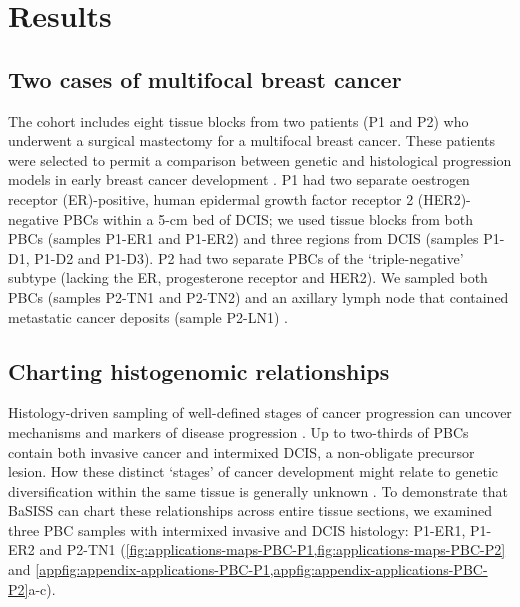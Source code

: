 \section{Results}
\subsection{Two cases of multifocal breast cancer}
\label{sec:applications-cohort-introduction}
The cohort includes eight tissue blocks from two patients (P1 and P2) who underwent a surgical mastectomy for a multifocal breast cancer. These patients were selected to permit a comparison between genetic and histological progression models in early breast cancer development \parencite{Cowell2013-du} . P1 had two separate oestrogen receptor (ER)-positive, human epidermal growth factor receptor 2 (HER2)-negative \acfp{PBC} within a 5-cm bed of \ac{DCIS}; we used tissue blocks from both \acp{PBC} (samples P1-ER1 and P1-ER2) and three regions from \ac{DCIS} (samples P1-D1, P1-D2 and P1-D3). P2 had two separate PBCs of the `triple-negative' subtype (lacking the ER, progesterone receptor and HER2). We sampled both PBCs (samples P2-TN1 and P2-TN2) and an axillary lymph node that contained metastatic cancer deposits (sample P2-LN1) .


\subsection{Charting histogenomic relationships}

Histology-driven sampling of well-defined stages of cancer progression can uncover mechanisms and markers of disease progression \parencite{Risom2022-uw,Casasent2018-gx,Cowell2013-du,Nirmal2022-sq}. Up to two-thirds of \acp{PBC} contain both invasive cancer and intermixed \ac{DCIS}, a non-obligate precursor lesion. How these distinct ‘stages’ of cancer development might relate to genetic diversification within the same tissue is generally unknown \parencite{Kole2019-hl} . To demonstrate that \ac{BaSISS} can chart these relationships across entire tissue sections, we examined three PBC samples with intermixed invasive and \ac{DCIS} histology: P1-ER1, P1-ER2 and P2-TN1 (\cref{fig:applications-maps-PBC-P1,fig:applications-maps-PBC-P2} and \cref{appfig:appendix-applications-PBC-P1,appfig:appendix-applications-PBC-P2}a-c).

